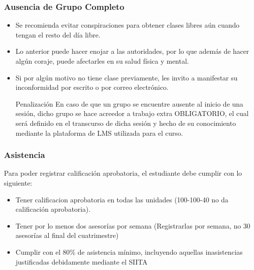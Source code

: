 \begin{frame}
\frametitle{Ausencia de Grupo Completo}
\begin{itemize}
\item Se recomienda evitar conspiraciones para obtener clases libres aún cuando tengan el resto del día libre.
\item Lo anterior puede hacer enojar a las autoridades, por lo que además de hacer algún coraje, puede afectarles en su salud física y mental. 
\item Si por algún motivo no tiene clase previamente, les invito a manifestar su inconformidad por escrito o por correo electrónico.
\begin{block}{Penalización}
En caso de que un grupo se encuentre ausente al inicio de una sesión, dicho grupo se hace acreedor a trabajo extra OBLIGATORIO, el cual será definido en el transcurso de dicha sesión y hecho de su conocimiento mediante la plataforma de LMS utilizada para el curso. 
\end{block}
\end{itemize}
\end{frame}

\begin{frame}
\frametitle{Asistencia}
Para poder registrar calificación aprobatoria, el estudiante debe cumplir con lo siguiente:
\begin{itemize} 
\item Tener calificacion aprobatoria en todas las unidades (100-100-40 no da calificación aprobatoria).
\item Tener por lo menos dos asesorías por semana (Registrarlas por semana, no 30 asesorías al final del cuatrimestre)
\item Cumplir con el 80\% de asistencia mínimo, incluyendo aquellas inasistencias justificadas debidamente mediante el SIITA
\end{itemize}
\end{frame}



